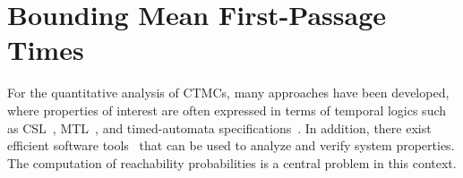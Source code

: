 \chapter{Bounding Mean First-Passage Times}\label{ch:MFPT}







For the quantitative analysis of CTMCs, many   approaches have been
developed, where properties of interest are often expressed in terms of temporal logics such as
CSL~\cite{aziz1996verifying,baier2000model,baier2003model},
MTL~\cite{chen2011time}, and timed-automata
specifications~\cite{chen2009quantitative,mikeev2013fly}.
In addition, there exist
efficient software
tools~\cite{hinton2006prism,kwiatkowska2011prism,dehnert2017storm}
that can be used to analyze and verify system properties.
The computation of reachability probabilities is a central problem in this context.

